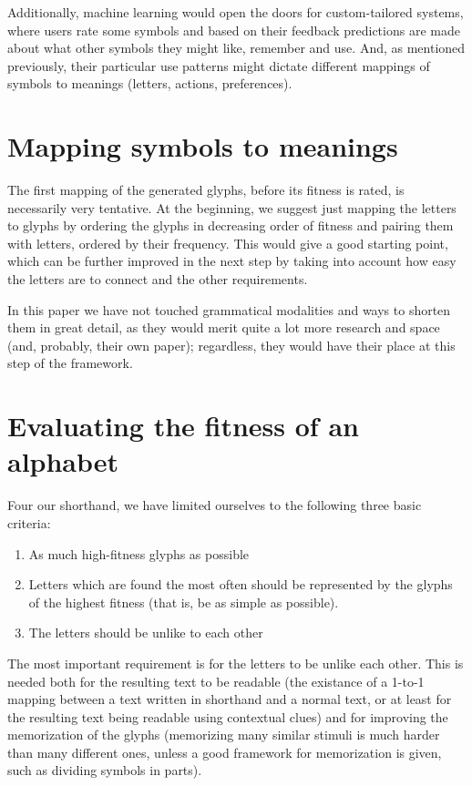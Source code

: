 \documentclass{vgtc}                          %
\begin{document}
Additionally, machine learning would open the doors for custom-tailored systems, where users rate some symbols and based on their feedback predictions are made about what other symbols they might like, remember and use. And, as mentioned previously, their particular use patterns might dictate different mappings of symbols to meanings (letters, actions, preferences). 
\section{Mapping symbols to meanings}
The first mapping of the generated glyphs, before its fitness is rated, is necessarily very tentative. At the beginning, we suggest just mapping the letters to glyphs by ordering the glyphs in decreasing order of fitness and pairing them with letters, ordered by their frequency. This would give a good starting point, which can be further improved in the next step by taking into account how easy the letters are to connect and the other requirements. 

In this paper we have not touched grammatical modalities and ways to shorten them in great detail, as they would merit quite a lot more research and space (and, probably, their own paper); regardless, they would have their place at this step of the framework. 
\section{Evaluating the fitness of an alphabet}
Four our shorthand, we have limited ourselves to the following three basic criteria:
\begin{enumerate}
        \item As much high-fitness glyphs as possible
        \item Letters which are found the most often should be represented by the glyphs of the highest fitness (that is, be as simple as possible).
        \item The letters should be unlike to each other
\end{enumerate}

The most important requirement is for the letters to be unlike each other. This is needed both for the resulting text to be readable (the existance of a 1-to-1 mapping between a text written in shorthand and a normal text, or at least for the resulting text being readable using contextual clues) and for improving the memorization of the glyphs (memorizing many similar stimuli is much harder than many different ones, unless a good framework for memorization is given, such as dividing symbols in parts). 
\end{document}
